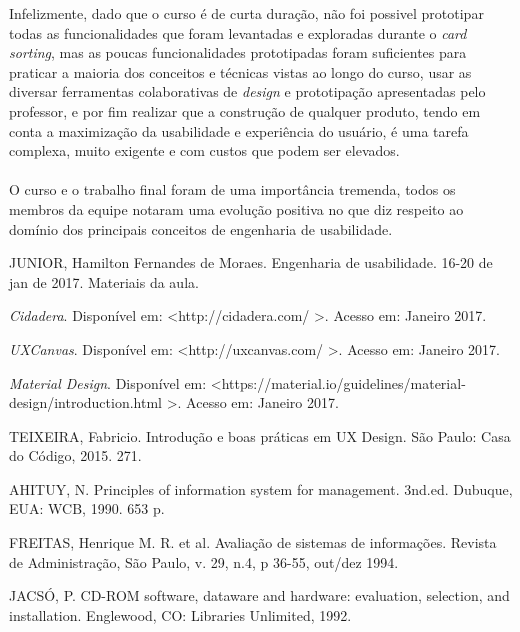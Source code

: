 \documentclass[a4paper,12pt,twoside]{report}
\begin{document}
Infelizmente, dado que o curso é de curta duração, não foi possivel prototipar todas as funcionalidades que foram levantadas e exploradas durante o \textit{card sorting}, mas as poucas funcionalidades prototipadas foram suficientes para praticar a maioria dos conceitos e técnicas vistas ao longo do curso, usar as diversar ferramentas colaborativas de \textit{design} e prototipação apresentadas pelo professor, e por fim realizar que a construção de qualquer produto, tendo em conta a maximização da usabilidade e experiência do usuário, é uma tarefa complexa, muito exigente e com custos que podem ser elevados.
\\~\\
O curso e o trabalho final foram de uma importância tremenda, todos os membros da equipe notaram uma evolução positiva no que diz respeito ao domínio dos principais conceitos de engenharia de usabilidade.

\begin{thebibliography}{9}

JUNIOR, Hamilton Fernandes de Moraes. Engenharia de usabilidade. 16-20 de jan de 2017. Materiais da aula. 

{\it Cidadera}. Disponível em: \textless http://cidadera.com/ \textgreater. Acesso em: Janeiro 2017.

{\it UXCanvas}. Disponível em: \textless http://uxcanvas.com/ \textgreater. Acesso em: Janeiro 2017.

{\it Material Design}. Disponível em: \textless https://material.io/guidelines/material-design/introduction.html \textgreater. Acesso em: Janeiro 2017.

TEIXEIRA, Fabricio. Introdução e boas práticas em UX Design. São Paulo: Casa do Código, 2015. 271.

AHITUY, N. Principles of information system for management. 3nd.ed. Dubuque, EUA: WCB, 1990. 653 p.

FREITAS, Henrique M. R. et al. Avaliação de sistemas de informações. Revista de Administração, São Paulo, v. 29, n.4, p 36-55, out/dez 1994.

JACSÓ, P. CD-ROM software, dataware and hardware: evaluation, selection, and installation. Englewood, CO: Libraries Unlimited, 1992.


\end{thebibliography}

\vfill
\end{document}
